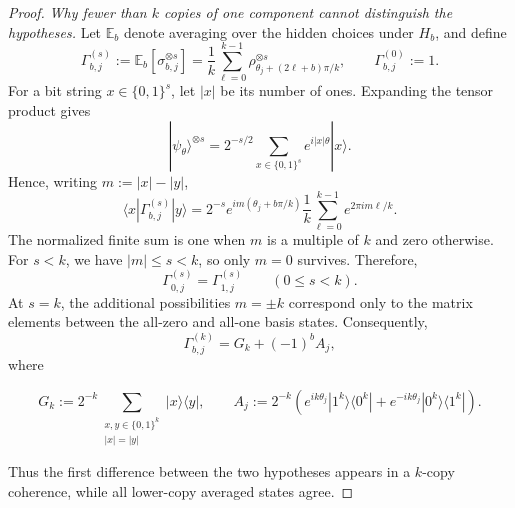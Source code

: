 \documentclass[aps,prx,reprint,superscriptaddress,amsmath,amssymb,longbibliography,floatfix]{revtex4-2}
\theoremstyle{plain}
\theoremstyle{definition}
\theoremstyle{remark}
\begin{document}
\begin{proof}
\emph{Why fewer than $k$ copies of one component cannot distinguish the hypotheses.} Let $\mathbb E_b$ denote averaging over the hidden choices under $H_b$, and define
\[
\Gamma_{b,j}^{(s)}:=\mathbb E_b[\sigma_{b,j}^{\otimes s}]=\frac1k\sum_{\ell=0}^{k-1}\rho_{\theta_j+(2\ell+b)\pi/k}^{\otimes s},\qquad \Gamma_{b,j}^{(0)}:=1.
\]
For a bit string $x\in\{0,1\}^s$, let $|x|$ be its number of ones. Expanding the tensor product gives
\[
|\psi_\theta\rangle^{\otimes s}=2^{-s/2}\sum_{x\in\{0,1\}^s}e^{i|x|\theta}|x\rangle.
\]
Hence, writing $m:=|x|-|y|$,
\[
\langle x|\Gamma_{b,j}^{(s)}|y\rangle=2^{-s}e^{im(\theta_j+b\pi/k)}\frac1k\sum_{\ell=0}^{k-1}e^{2\pi i m\ell/k}.
\]
The normalized finite sum is one when $m$ is a multiple of $k$ and zero otherwise. For $s<k$, we have $|m|\le s<k$, so only $m=0$ survives. Therefore,
\begin{equation}
\Gamma_{0,j}^{(s)}=\Gamma_{1,j}^{(s)}\qquad(0\le s<k).
\label{eq:app-mmd-lower-copy-matching}
\end{equation}
At $s=k$, the additional possibilities $m=\pm k$ correspond only to the matrix elements between the all-zero and all-one basis states. Consequently,
\[
\Gamma_{b,j}^{(k)}=G_k+(-1)^bA_j,
\]
where
\begin{widetext}
\[
G_k:=2^{-k}\sum_{\substack{x,y\in\{0,1\}^k\\|x|=|y|}}|x\rangle\langle y|,\qquad A_j:=2^{-k}\left(e^{ik\theta_j}|1^k\rangle\langle0^k|+e^{-ik\theta_j}|0^k\rangle\langle1^k|\right).
\]
\end{widetext}
Thus the first difference between the two hypotheses appears in a $k$-copy coherence, while all lower-copy averaged states agree.


\end{proof}
\end{document}
